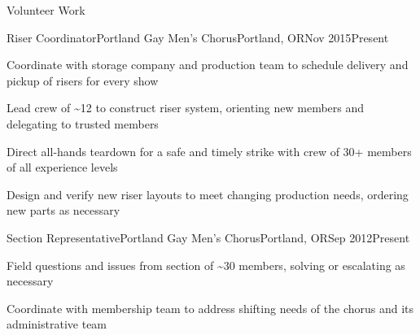\documentclass[letterpaper,12pt]{article}
\begin{document}
\begin{paracol}{2}
\begin{rsection}{Volunteer Work}
  \begin{rexperienceitem}{Riser Coordinator}{Portland Gay Men's Chorus}{Portland, OR}{Nov 2015}{Present}
    \item Coordinate with storage company and production team to schedule delivery and pickup of risers for every show
    \item Lead crew of \textasciitilde12 to construct riser system, orienting new members and delegating to trusted members
    \item Direct all-hands teardown for a safe and timely strike with crew of 30+ members of all experience levels
    \item Design and verify new riser layouts to meet changing production needs, ordering new parts as necessary
  \end{rexperienceitem}
  \begin{rexperienceitem}{Section Representative}{Portland Gay Men's Chorus}{Portland, OR}{Sep 2012}{Present}
    \item Field questions and issues from section of \textasciitilde30 members, solving or escalating as necessary
    \item Coordinate with membership team to address shifting needs of the chorus and its administrative team
  \end{rexperienceitem}
\end{rsection}

\flushpage
\end{paracol}
\end{document}
